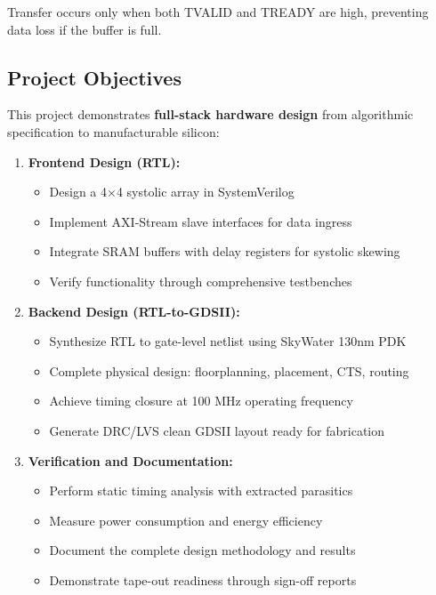 \documentclass[12pt,a4paper]{article}
\begin{document}
Transfer occurs only when both TVALID and TREADY are high, preventing data loss if the buffer is full.

\subsection{Project Objectives}

This project demonstrates \textbf{full-stack hardware design} from algorithmic specification to manufacturable silicon:

\begin{enumerate}
    \item \textbf{Frontend Design (RTL):}
    \begin{itemize}
        \item Design a 4×4 systolic array in SystemVerilog
        \item Implement AXI-Stream slave interfaces for data ingress
        \item Integrate SRAM buffers with delay registers for systolic skewing
        \item Verify functionality through comprehensive testbenches
    \end{itemize}
    
    \item \textbf{Backend Design (RTL-to-GDSII):}
    \begin{itemize}
        \item Synthesize RTL to gate-level netlist using SkyWater 130nm PDK
        \item Complete physical design: floorplanning, placement, CTS, routing
        \item Achieve timing closure at 100 MHz operating frequency
        \item Generate DRC/LVS clean GDSII layout ready for fabrication
    \end{itemize}
    
    \item \textbf{Verification and Documentation:}
    \begin{itemize}
        \item Perform static timing analysis with extracted parasitics
        \item Measure power consumption and energy efficiency
        \item Document the complete design methodology and results
        \item Demonstrate tape-out readiness through sign-off reports
    \end{itemize}
\end{enumerate}
\end{document}
